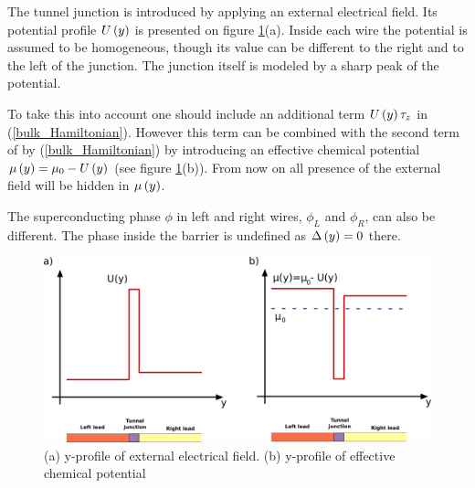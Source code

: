 The tunnel junction is introduced  by applying an external electrical field. Its potential profile $U\left(y\right)  $ is presented on figure \ref{fig:chemandextpotentials}(a). Inside each wire the potential is assumed to be homogeneous, though its value can be different to the right and to the left of the junction. The junction itself is modeled by a sharp peak of the potential.
 
To take this into account one should include an additional term $ U \left(y\right)\tau_z $ in (\ref{bulk_Hamiltonian}). However this term can be combined with the second term of  by (\ref{bulk_Hamiltonian}) by introducing an effective chemical potential $ \mu \left(y\right) = \mu_0 - U\left(y\right)  $ (see figure \ref{fig:chemandextpotentials}(b)). From now on all presence of  the external field will be hidden in $ \mu\left(y\right) $.

The superconducting phase $ \phi $ in left and right wires, $ \phi_L $ and $ \phi_R $, can also be different. The phase inside the barrier is undefined as $ \Delta\left(y\right)=0 $ there.



\begin{figure}[H]
	\centering
	\includegraphics[width=0.8\linewidth]{images/chem_and_ext_potentials}
	\caption{(a) y-profile of external electrical field.  (b) y-profile of effective chemical potential}
	\label{fig:chemandextpotentials}
\end{figure}


